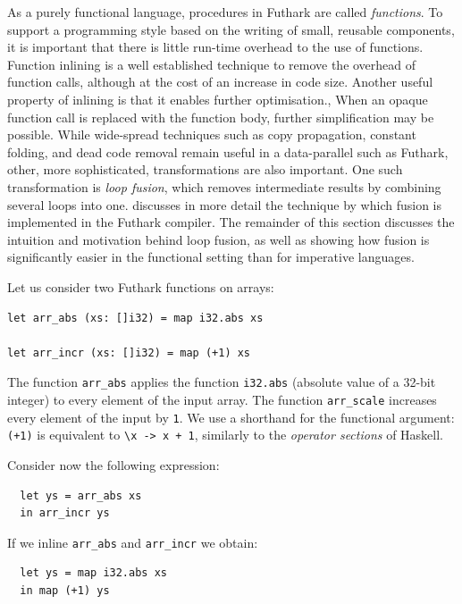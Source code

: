 As a purely functional language, procedures in Futhark are called
\textit{functions}.  To support a programming style based on the
writing of small, reusable components, it is important that there is
little run-time overhead to the use of functions.  Function inlining
is a well established technique to remove the overhead of function
calls, although at the cost of an increase in code size.  Another
useful property of inlining is that it enables further optimisation.,
When an opaque function call is replaced with the function body,
further simplification may be possible.  While wide-spread techniques
such as copy propagation, constant folding, and dead code removal
remain useful in a data-parallel such as Futhark, other, more
sophisticated, transformations are also important.  One such
transformation is \textit{loop fusion}, which removes intermediate
results by combining several loops into one.  
discusses in more detail the technique by which fusion is implemented
in the Futhark compiler. The remainder of this section discusses the
intuition and motivation behind loop fusion, as well as showing how
fusion is significantly easier in the functional setting than for
imperative languages.

Let us consider two Futhark functions on arrays:

\begin{lstlisting}
let arr_abs (xs: []i32) = map i32.abs xs

let arr_incr (xs: []i32) = map (+1) xs
\end{lstlisting}

The function \lstinline{arr_abs} applies the function
\lstinline{i32.abs} (absolute value of a 32-bit integer) to every
element of the input array.  The function \lstinline{arr_scale}
increases every element of the input by \lstinline{1}.  We use a
shorthand for the functional argument: \lstinline{(+1)} is equivalent
to \lstinline{\x -> x + 1}, similarly to the \textit{operator
  sections} of Haskell.

Consider now the following expression:

\begin{lstlisting}
  let ys = arr_abs xs
  in arr_incr ys
\end{lstlisting}

If we inline \lstinline{arr_abs} and \lstinline{arr_incr} we obtain:

\begin{lstlisting}
  let ys = map i32.abs xs
  in map (+1) ys
\end{lstlisting}

